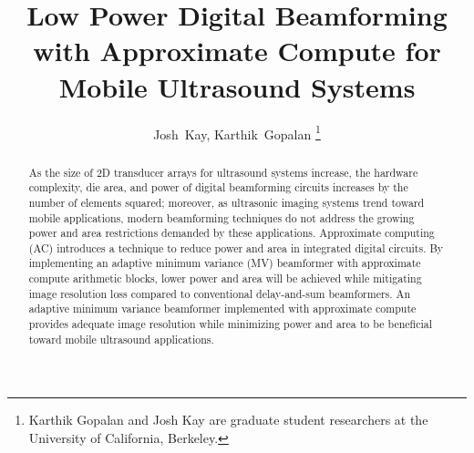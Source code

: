 \documentclass[journal]{IEEEtran}
\begin{document}
%
\title{Low Power Digital Beamforming\\ with Approximate Compute for Mobile Ultrasound Systems}
%
%
%

\author{Josh~Kay, Karthik~Gopalan %
\thanks{Karthik Gopalan and Josh Kay are graduate student researchers at the University of California, Berkeley.}}%




\maketitle

\begin{abstract}
As the size of 2D transducer arrays for ultrasound systems increase, the hardware complexity, die area, and power of digital beamforming circuits increases by the number of elements squared; moreover, as ultrasonic imaging systems trend toward mobile applications, modern beamforming techniques do not address the growing power and area restrictions demanded by these applications. Approximate computing (AC) introduces a technique to reduce power and area in integrated digital circuits. By implementing an adaptive minimum variance (MV) beamformer with approximate compute arithmetic blocks, lower power and area will be achieved while mitigating image resolution loss compared to conventional delay-and-sum beamformers. An adaptive minimum variance beamformer implemented with approximate compute provides adequate image resolution while minimizing power and area to be beneficial toward mobile ultrasound applications. 
\end{abstract}
\end{document}
